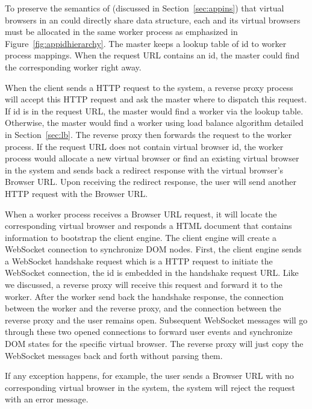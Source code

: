 
To preserve the semantics of \appins (discussed in Section~\ref{sec:appins})
that virtual browsers in an \appins could directly share data structure, each
\appins and its virtual browsers must be allocated in the same worker process
as emphasized in Figure~\ref{fig:appidhierarchy}. The master keeps a lookup
table of \appins id to worker process mappings.  When the request URL contains
an \appins id,  the master could find the corresponding worker right away.

When the client sends a HTTP request to the system, a reverse proxy process
will accept this HTTP request and ask the master where to dispatch this
request. If \appins id is in the request URL, the master would find a worker
via the lookup table. Otherwise, the master would find a worker using load
balance algorithm detailed in Section~\ref{sec:lb}. The reverse proxy then
forwards the request to the worker process. If the request URL does not
contain virtual browser id, the worker process would allocate a new virtual
browser or find an existing virtual browser in the system and sends back a
redirect response with the virtual browser's Browser URL. Upon receiving the
redirect response, the user will send another HTTP request with the Browser
URL.

When a worker process receives a Browser URL request, it will locate the
corresponding virtual browser and responds a HTML document that contains
information to bootstrap the client engine. The client engine will create a
WebSocket connection to synchronize DOM nodes. First, the client engine sends
a WebSocket handshake request which is a HTTP request to initiate the
WebSocket connection, the \appins id is embedded in the handshake request URL.
Like we discussed, a reverse proxy will receive this request and forward it to
the worker. After the worker send back the handshake response, the connection
between the worker and the reverse proxy, and the connection between the
reverse proxy and the user remains open. Subsequent WebSocket messages will go
through these two opened connections to forward user events and synchronize
DOM states for the specific virtual browser. The reverse proxy will just copy
the WebSocket messages back and forth without parsing them.

If any exception happens, for example, the user sends a Browser URL with no
corresponding virtual browser in the system, the system will reject the
request with an error message.


